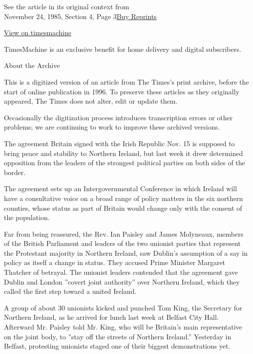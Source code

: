 See the article in its original context from\\
November 24, 1985, Section 4, Page
3\href{https://store.nytimes.com/collections/new-york-times-page-reprints?utm_source=nytimes\&utm_medium=article-page\&utm_campaign=reprints}{Buy
Reprints}

\href{http://timesmachine.nytimes.com/timesmachine/1985/11/24/178578.html}{View
on timesmachine}

TimesMachine is an exclusive benefit for home delivery and digital
subscribers.

About the Archive

This is a digitized version of an article from The Times's print
archive, before the start of online publication in 1996. To preserve
these articles as they originally appeared, The Times does not alter,
edit or update them.

Occasionally the digitization process introduces transcription errors or
other problems; we are continuing to work to improve these archived
versions.

The agreement Britain signed with the Irish Republic Nov. 15 is supposed
to bring peace and stability to Northern Ireland, but last week it drew
determined opposition from the leaders of the strongest political
parties on both sides of the border.

The agreement sets up an Intergovernmental Conference in which Ireland
will have a consultative voice on a broad range of policy matters in the
six northern counties, whose status as part of Britain would change only
with the consent of the population.

Far from being reassured, the Rev. Ian Paisley and James Molyneaux,
members of the British Parliament and leaders of the two unionist
parties that represent the Protestant majority in Northern Ireland, saw
Dublin's assumption of a say in policy as itself a change in status.
They accused Prime Minister Margaret Thatcher of betrayal. The unionist
leaders contended that the agreement gave Dublin and London ''covert
joint authority'' over Northern Ireland, which they called the first
step toward a united Ireland.

A group of about 30 unionists kicked and punched Tom King, the Secretary
for Northern Ireland, as he arrived for lunch last week at Belfast City
Hall. Afterward Mr. Paisley told Mr. King, who will be Britain's main
representative on the joint body, to ''stay off the streets of Northern
Ireland.'' Yesterday in Belfast, protesting unionists staged one of
their biggest demonstrations yet.

